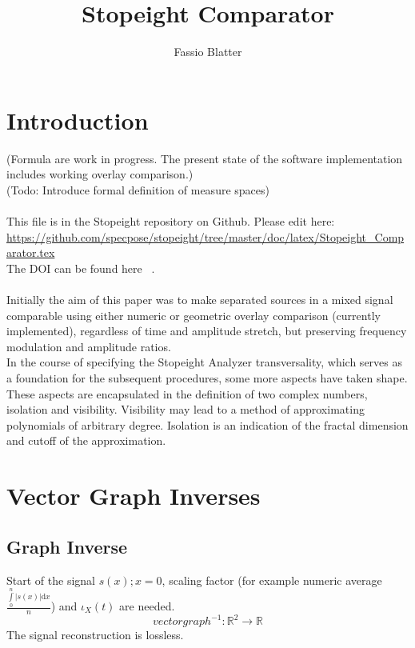 \documentclass{report}
\begin{document}
\title{Stopeight Comparator}
\author{Fassio Blatter}
\maketitle

\chapter{Introduction}
(Formula are work in progress. The present state of the software implementation includes working overlay comparison.)\\
(Todo: Introduce formal definition of measure spaces)\\\\
This file is in the Stopeight repository on Github. Please edit here:\\
\href{https://github.com/specpose/stopeight/tree/master/doc/latex/Stopeight\_Comparator.tex}{https://github.com/specpose/stopeight/tree/master/doc/latex/Stopeight\_Comparator.tex}\\
The DOI can be found here ~\cite{Stopeight}.\\\\
Initially the aim of this paper was to make separated sources in a mixed signal comparable using either numeric or geometric overlay comparison (currently implemented), regardless of time and amplitude stretch, but preserving frequency modulation and amplitude ratios.\\
In the course of specifying the Stopeight Analyzer transversality, which serves as a foundation for the subsequent procedures, some more aspects have taken shape. These aspects are encapsulated in the definition of two complex numbers, isolation and visibility. Visibility may lead to a method of approximating polynomials of arbitrary degree. Isolation is an indication of the fractal dimension and cutoff of the approximation.

\chapter{Vector Graph Inverses}
\section{Graph Inverse}
Start of the signal $s(x);x=0$, scaling factor (for example numeric average $\frac{\int \limits _{0}^{n}\vert s(x)\vert \mathrm{d}x}{n}$) and $\iota_{X}(t)$ are needed.
\begin{equation}
vectorgraph^{-1}: \mathbb{R}^2 \rightarrow \mathbb{R}
\end{equation}
The signal reconstruction is lossless.
\end{document}

